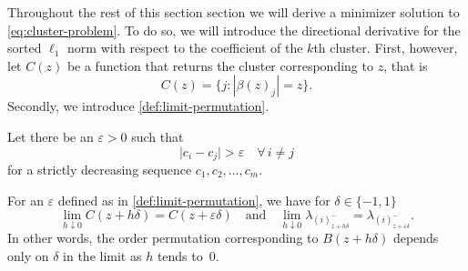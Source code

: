 
Throughout the rest of this section section we will derive a minimizer
solution to \eqref{eq:cluster-problem}. To do so, we will introduce the
directional derivative for the sorted \(\ell_1\) norm with respect to the
coefficient of the \(k\)th cluster. First, however, let
\(C(z)\) be a function that returns the cluster corresponding to \(z\), that is
\[
  C(z) = \{j : |\beta(z)_j| = z\}.
\]
Secondly, we introduce \cref{def:limit-permutation}.
\begin{definition} 
  \label{def:limit-permutation}
  Let there be an \(\varepsilon > 0\) such that
  \begin{equation*}
    \big| c_i - c_j\big| > \varepsilon \quad \forall\, i \neq j
  \end{equation*}
  for a strictly decreasing sequence \(c_1, c_2, ..., c_m\).
\end{definition}

For an \(\varepsilon\) defined as in \cref{def:limit-permutation}, we have for
\(\delta \in \{-1, 1\}\)
\begin{equation}
  \lim_{h \downarrow 0} C(z + h\delta) = C(z + \varepsilon \delta)
  \quad\text{and}\quad
  \lim_{h \downarrow 0} \lambda_{(i)^-_{z + h\delta}}
  = \lambda_{(i)^-_{z + \varepsilon\delta}}.
\end{equation}
In other words, the order permutation corresponding to \(B(z + h\delta)\)
depends only on \(\delta\) in the limit as \(h\) tends to~\(0\). 

